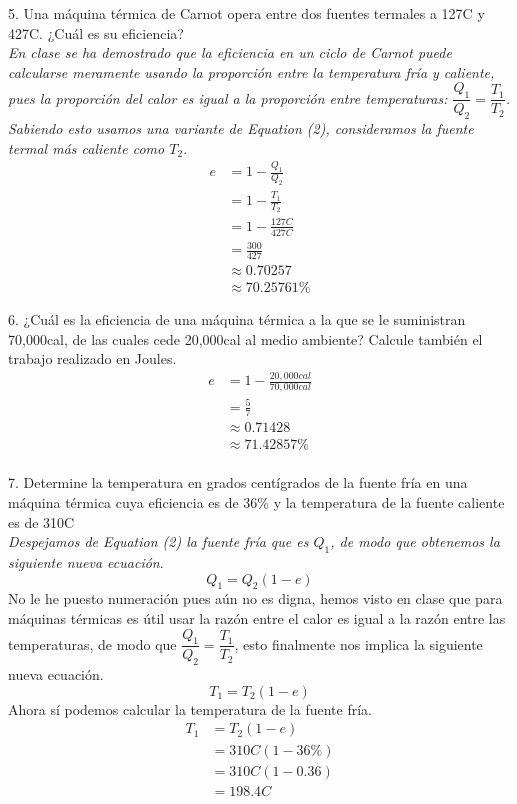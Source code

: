 \documentclass{article}
\begin{document}
5. Una máquina térmica de Carnot opera entre dos fuentes termales a 127C y
427C. ¿Cuál es su eficiencia? \\
\textit{En clase se ha demostrado que la eficiencia en un ciclo de Carnot puede calcularse meramente usando la proporción entre la temperatura fría y caliente, pues la proporción del calor es igual a la proporción entre temperaturas: $\dfrac{Q_1}{Q_2} = \dfrac{T_1}{T_2} $. Sabiendo esto usamos una variante de Equation (2), consideramos la fuente termal más caliente como $T_2$.}
\begin{align*}
    e &= 1 - \frac{Q_1}{Q_2} \\
    &= 1 - \frac{T_1}{T_2} \\
    &= 1 - \frac{127C}{427C} \\
    &= \frac{300}{427} \\
    &\approx 0.70257 \\
    &\approx 70.25761 \%
\end{align*}

6. ¿Cuál es la eficiencia de una máquina térmica a la que se le suministran
70,000cal, de las cuales cede 20,000cal al medio ambiente? Calcule también el
trabajo realizado en Joules. \\
\begin{align*}
    e &= 1 - \frac{20,000cal}{70,000cal} \\
    &= \frac{5}{7} \\
    &\approx 0.71428 \\
    &\approx 71.42857 \% \\
\end{align*}

7. Determine la temperatura en grados centígrados de la fuente fría en una
máquina térmica cuya eficiencia es de 36\% y la temperatura de la fuente caliente es de 310C \\
\textit{Despejamos de Equation (2) la fuente fría que es $Q_1$, de modo que obtenemos la siguiente nueva ecuación}.
\begin{equation*}
    Q_1 = Q_2(1 - e)
\end{equation*}
No le he puesto numeración pues aún no es digna, hemos visto en clase que para máquinas térmicas es útil usar la razón entre el calor es igual a la razón entre las temperaturas, de modo que $\dfrac{Q_1}{Q_2} = \dfrac{T_1}{T_2} $, esto finalmente nos implica la siguiente nueva ecuación.
\begin{equation*}
    T_1 = T_2(1 - e)
\end{equation*}
Ahora sí podemos calcular la temperatura de la fuente fría.
\begin{align*}
     T_1 &= T_2(1 - e) \\
     &= 310C(1 - 36 \%) \\
     &= 310C(1 - 0.36) \\
     &= 198.4C \\
\end{align*}
\end{document}
